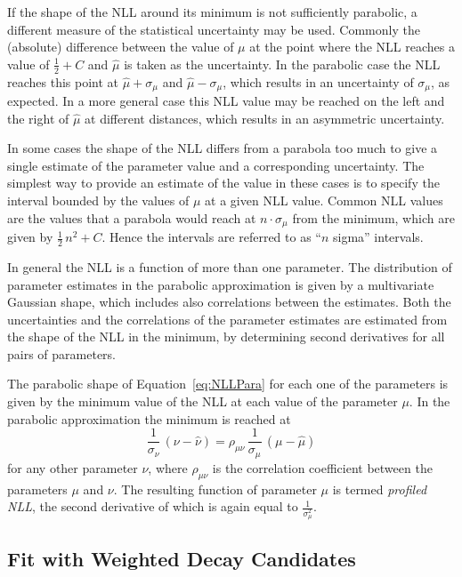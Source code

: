 If the shape of the NLL around its minimum is not sufficiently parabolic, a different measure of the statistical uncertainty may be used.
Commonly the (absolute) difference between the value of $\mu$ at the point where the NLL reaches a value of $\tfrac{1}{2}+C$ and
$\hat{\mu}$ is taken as the uncertainty. In the parabolic case the NLL reaches this point at $\hat{\mu}+\sigma_\mu$ and
$\hat{\mu}-\sigma_\mu$, which results in an uncertainty of $\sigma_\mu$, as expected. In a more general case this NLL value may be reached
on the left and the right of $\hat{\mu}$ at different distances, which results in an asymmetric uncertainty.

In some cases the shape of the NLL differs from a parabola too much to give a single estimate of the parameter value and a corresponding
uncertainty. The simplest way to provide an estimate of the value in these cases is to specify the interval bounded by the values of $\mu$
at a given NLL value. Common NLL values are the values that a parabola would reach at $n\cdot\sigma_\mu$ from the minimum, which are given
by $\tfrac{1}{2}\,n^2+C$. Hence the intervals are referred to as ``$n$ sigma'' intervals.

In general the NLL is a function of more than one parameter. The distribution of parameter estimates in the parabolic approximation is
given by a multivariate Gaussian shape, which includes also correlations between the estimates. Both the uncertainties and the correlations
of the parameter estimates are estimated from the shape of the NLL in the minimum, by determining second derivatives for all pairs
of parameters.

The parabolic shape of Equation~\ref{eq:NLLPara} for each one of the parameters is given by the minimum value of the NLL at each value of
the parameter $\mu$. In the parabolic approximation the minimum is reached at
\begin{equation}
  \frac{1}{\sigma_\nu}\, (\nu-\hat{\nu})  = \rho_{\mu\nu}\, \frac{1}{\sigma_\mu}\, (\mu-\hat{\mu})
\end{equation}
for any other parameter $\nu$, where $\rho_{\mu\nu}$ is the correlation coefficient between the parameters $\mu$ and $\nu$. The resulting
function of parameter $\mu$ is termed \emph{profiled NLL}, the second derivative of which is again equal to $\frac{1}{\sigma_\mu^2}$.


\subsection{Fit with Weighted Decay Candidates}
\label{subsec:ana_fit_weights}

